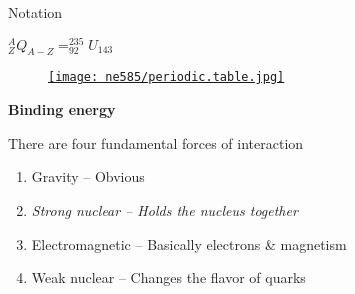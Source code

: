 \documentclass[aspectratio=1610,pdftex,dvipsnames,compress,xcolor={dvipsnames}]{beamer}
\begin{document}
\begin{frame}{Notation}

    \vspace*{\fill}
    
    \centering
    \LARGE
    $^{A}_{Z}Q_{A-Z} = ^{235}_{92}U_{143}$

    \vspace*{\fill}

\end{frame}


\begin{frame}{}
    \begin{figure}
        \centering
        \href{https://ptable.com/}{\texttt{[image: ne585/periodic.table.jpg]}}
    \end{figure}
\end{frame}


\begin{frame}[plain]{}
    \centering\LARGE\textbf{Binding energy}
\end{frame}


\addtocounter{framenumber}{-1}
\begin{frame}{There are four fundamental forces of interaction}
    \begin{enumerate}[series=outerlist,topsep=0pt,itemsep=21pt,leftmargin=*,label=(\arabic*)]
        \item[]Gravity -- Obvious
        \item[]\textit{Strong nuclear -- Holds the nucleus together}
        \item[]Electromagnetic -- Basically electrons \& magnetism
        \item[]Weak nuclear -- Changes the flavor of quarks
    \end{enumerate}
\end{frame}
\end{document}
